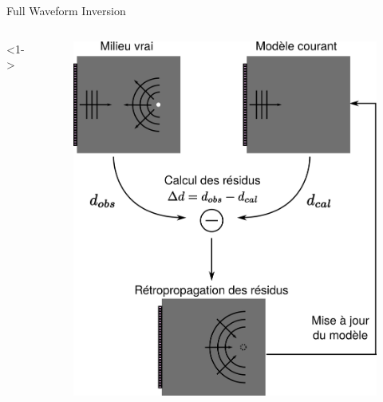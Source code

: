 \begin{frame}{Full Waveform Inversion}
\begin{columns}
		
		<1->
		\begin{figure}
			\centering
			\hspace{-0.3cm}\includegraphics[width=\textwidth]{img/schema_fwi2.png}
		\end{figure}
	\end{columns}
	
\end{frame}

